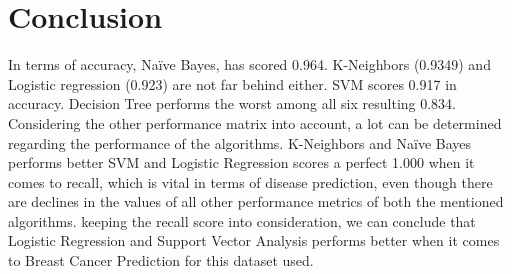 \documentclass[conference]{IEEEtran}
\begin{document}
\section*{Conclusion}

In terms of accuracy, Naïve Bayes, has scored 0.964. K-Neighbors (0.9349) and Logistic regression (0.923) are not far behind either. SVM scores 0.917 in accuracy. Decision Tree performs the worst among all six resulting 0.834. 
Considering the other performance matrix into account, a lot can be determined regarding the performance of the algorithms. K-Neighbors and Naïve Bayes performs better SVM and Logistic Regression scores a perfect 1.000 when it comes to recall, which is vital in terms of disease prediction, even though there are declines in the values of all other performance metrics of both the mentioned algorithms. keeping the recall score into consideration, we can conclude that Logistic Regression and Support Vector Analysis performs better when it comes to Breast Cancer Prediction for this dataset used.
\end{document}
